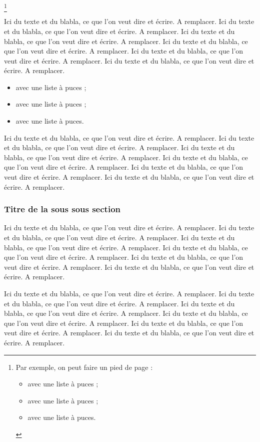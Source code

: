 \protect\footnote{Par exemple, on peut faire un pied de page :
\begin{itemize}
\item avec une liste à puces ;
\item avec une liste à puces ;
\item avec une liste à puces.
\end{itemize}
}

Ici du texte et du blabla, ce que l'on veut dire et écrire. A remplacer. Ici du texte et du blabla, ce que l'on veut dire et écrire. A remplacer. Ici du texte et du blabla, ce que l'on veut dire et écrire. A remplacer. Ici du texte et du blabla, ce que l'on veut dire et écrire. A remplacer. Ici du texte et du blabla, ce que l'on veut dire et écrire. A remplacer. Ici du texte et du blabla, ce que l'on veut dire et écrire. A remplacer.

\begin{itemize}
\item avec une liste à puces ;
\item avec une liste à puces ;
\item avec une liste à puces.
\end{itemize}

Ici du texte et du blabla, ce que l'on veut dire et écrire. A remplacer. Ici du texte et du blabla, ce que l'on veut dire et écrire. A remplacer. Ici du texte et du blabla, ce que l'on veut dire et écrire. A remplacer. Ici du texte et du blabla, ce que l'on veut dire et écrire. A remplacer. Ici du texte et du blabla, ce que l'on veut dire et écrire. A remplacer. Ici du texte et du blabla, ce que l'on veut dire et écrire. A remplacer.

\subsubsection{Titre de la sous sous section}

Ici du texte et du blabla, ce que l'on veut dire et écrire. A remplacer. Ici du texte et du blabla, ce que l'on veut dire et écrire. A remplacer. Ici du texte et du blabla, ce que l'on veut dire et écrire. A remplacer. Ici du texte et du blabla, ce que l'on veut dire et écrire. A remplacer. Ici du texte et du blabla, ce que l'on veut dire et écrire. A remplacer. Ici du texte et du blabla, ce que l'on veut dire et écrire. A remplacer.

Ici du texte et du blabla, ce que l'on veut dire et écrire. A remplacer. Ici du texte et du blabla, ce que l'on veut dire et écrire. A remplacer. Ici du texte et du blabla, ce que l'on veut dire et écrire. A remplacer. Ici du texte et du blabla, ce que l'on veut dire et écrire. A remplacer. Ici du texte et du blabla, ce que l'on veut dire et écrire. A remplacer. Ici du texte et du blabla, ce que l'on veut dire et écrire. A remplacer.

